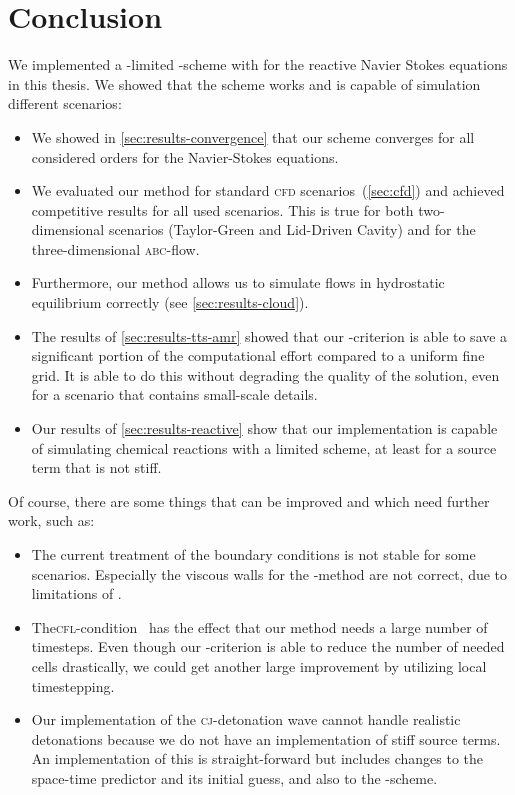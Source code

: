 \chapter{Conclusion}\label{chap:conclusion}
We implemented a \muscl{}-limited \aderdg{}-scheme with \amr{} for the reactive Navier Stokes equations in this thesis.
We showed that the scheme works and is capable of simulation different scenarios:
\begin{itemize}
\item We showed in \cref{sec:results-convergence} that our scheme converges for all considered orders for the Navier-Stokes equations.
\item We evaluated our method for standard \textsc{cfd} scenarios~(\cref{sec:cfd}) and achieved competitive results for all used scenarios.
  This is true for both two-dimensional scenarios (Taylor-Green and Lid-Driven Cavity) and for the three-dimensional \textsc{abc}-flow.
\item Furthermore, our method allows us to simulate flows in hydrostatic equilibrium correctly (see \cref{sec:results-cloud}).
\item The results of \cref{sec:results-tts-amr} showed that our \amr{}-criterion is able to save a significant portion of the computational effort compared to a uniform fine grid.
  It is able to do this without degrading the quality of the solution, even for a scenario that contains small-scale details.
\item Our results of \cref{sec:results-reactive} show that our implementation is capable of simulating chemical reactions with a limited scheme, at least for a source term that is not stiff.
\end{itemize}

Of course, there are some things that can be improved and which need further work, such as:
\begin{itemize}
\item The current treatment of the boundary conditions is not stable for some scenarios.
  Especially the viscous walls for the \muscl{}-method are not correct, due to limitations of \exahype{}.
\item The\textsc{cfl}-condition~ has the effect that our method needs a large number of timesteps.
  Even though our \amr{}-criterion is able to reduce the number of needed cells drastically, we could get another large improvement by utilizing local timestepping.
\item Our implementation of the \textsc{cj}-detonation wave cannot handle realistic detonations because we do not have an implementation of stiff source terms.
  An implementation of this is straight-forward but includes changes to the space-time predictor and its initial guess, and also to the \muscl{}-scheme.
\end{itemize}

